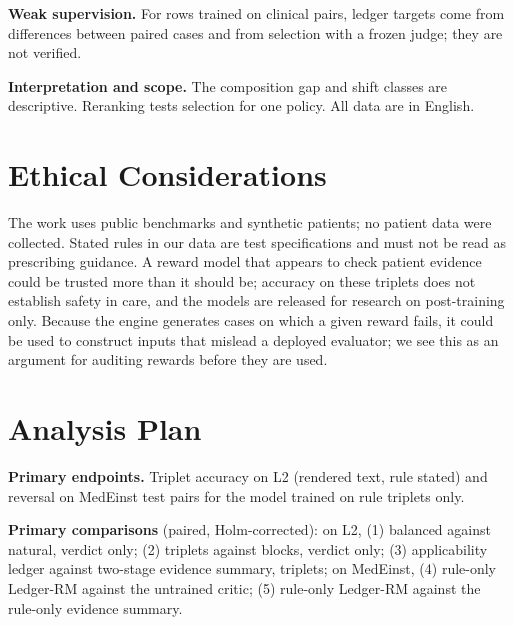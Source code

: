 \documentclass[11pt]{article}
\newif\ifplaceholders
\newcommand{\method}{Ledger-RM}
\begin{document}
\textbf{Weak supervision.} For rows trained on clinical pairs, ledger targets
come from differences between paired cases and from selection with a frozen
judge; they are not verified.

\textbf{Interpretation and scope.} The composition gap and shift classes are
descriptive. Reranking tests selection for one policy. All data are in
English.

\section*{Ethical Considerations}

The work uses public benchmarks and synthetic patients; no patient data were
collected. Stated rules in our data are test specifications and must not be
read as prescribing guidance. A reward model that appears to check patient
evidence could be trusted more than it should be; accuracy on these triplets
does not establish safety in care, and the models are released for research on
post-training only. Because the engine generates cases on which a given reward
fails, it could be used to construct inputs that mislead a deployed evaluator;
we see this as an argument for auditing rewards before they are used.



\appendix

\section{Analysis Plan}
\label{app:plan}

\ifplaceholders
\noindent\textcolor{red}{\textbf{Draft status.} No experiment in this
manuscript has been run. Every value printed in red, and every curve marked as
placeholder data, is a target value used to lay out the paper. This paragraph
and the red banner disappear, and the build fails on any remaining
placeholder, once measured values are entered.}\smallskip
\fi

\noindent\textbf{Primary endpoints.} Triplet accuracy on L2 (rendered text,
rule stated) and reversal on MedEinst test pairs for the model trained on
rule triplets only.

\noindent\textbf{Primary comparisons} (paired, Holm-corrected): on L2,
(1) balanced against natural, verdict only; (2) triplets against blocks,
verdict only; (3) applicability ledger against two-stage evidence summary,
triplets; on MedEinst, (4) rule-only \method{} against the untrained critic;
(5) rule-only \method{} against the rule-only evidence summary.
\end{document}
